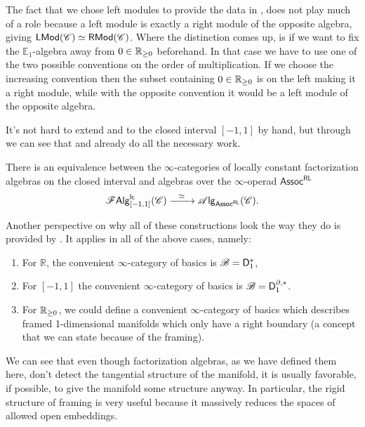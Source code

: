 \documentclass[../text]{subfiles}
\begin{document}
\begin{remark}\label{rem:left_or_right_module}
    The fact that we chose left modules to provide the data in , does not play much of a role because a left module is exactly a right module of the opposite algebra, giving $\mathsf{LMod}(\mathscr{C}) \simeq \mathsf{RMod}(\mathscr{C})$. Where the distinction comes up, is if we want to fix the $\mathbb{E}_1$-algebra away from $0 \in \mathbb{R}_{\geq 0}$ beforehand. In that case we have to use one of the two possible conventions on the order of multiplication. If we choose the increasing convention then the subset containing $0 \in \mathbb{R}_{\geq 0}$ is on the left making it a right module, while with the opposite convention it would be a left module of the opposite algebra.
\end{remark}

It's not hard to extend  and  to the closed interval $[-1,1]$ by hand, but through  we can see that  and  already do all the necessary work.

\begin{corollary}\label{cor:lcfas_on_closed_int}
    There is an equivalence between the $\infty$-categories of locally constant factorization algebras on the closed interval and algebras over the $\infty$-operad $\mathsf{Assoc^{RL}}$
    \begin{equation}
        \lcfa_{[-1,1]} (\catC) \xrightarrow{\ \ \simeq \ \ } \alg{\mathsf{Assoc^{RL}}} (\catC).
    \end{equation} 
\end{corollary}

\begin{remark}
    Another perspective on why all of these constructions look the way they do is provided by . It applies in all of the above cases, namely:
    \begin{enumerate}
        \item For $\mathbb{R}$, the convenient $\infty$-category of basics is $\mathscr{B} = \mathsf{D}_1^*$,
        \item For $[-1,1]$ the convenient $\infty$-category of basics is $\mathscr{B} = \mathsf{D}_1^{\partial, *}$.
        \item For $\mathbb{R}_{\geq 0}$, we could define a convenient $\infty$-category of basics which describes framed 1-dimensional manifolds which only have a right boundary (a concept that we can state because of the framing).
    \end{enumerate}
    We can see that even though factorization algebras, as we have defined them here, don't detect the tangential structure of the manifold, it is usually favorable, if possible, to give the manifold some structure anyway. In particular, the rigid structure of framing is very useful because it massively reduces the spaces of allowed open embeddings.
\end{remark}
\end{document}
